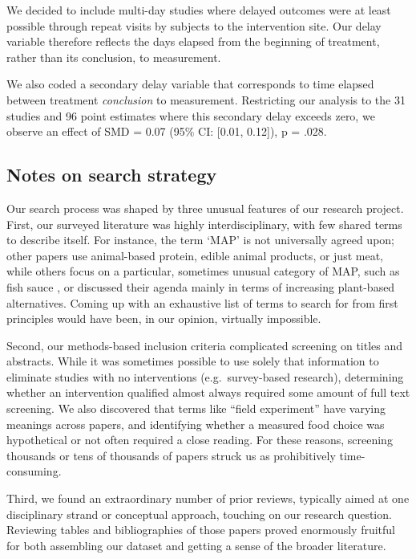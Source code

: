 \documentclass[sn-nature,referee,pdflatex]{sn-jnl}
\begin{document}
We decided to include multi-day studies where delayed outcomes were at
least possible through repeat visits by subjects to the intervention
site. Our delay variable therefore reflects the days elapsed from the
beginning of treatment, rather than its conclusion, to measurement.

We also coded a secondary delay variable that corresponds to time
elapsed between treatment \emph{conclusion} to measurement. Restricting
our analysis to the 31 studies and 96 point estimates where this
secondary delay exceeds zero, we observe an effect of SMD = 0.07 (95\%
CI: {[}0.01, 0.12{]}), p = .028.

\subsection{Notes on search strategy}\label{Sec5.2}

Our search process was shaped by three unusual features of our research
project. First, our surveyed literature was highly interdisciplinary,
with few shared terms to describe itself. For instance, the term `MAP'
is not universally agreed upon; other papers use animal-based protein,
edible animal products, or just meat, while others focus on a
particular, sometimes unusual category of MAP, such as fish sauce
\citep{kanchanachitra2020}, or discussed their agenda mainly in terms of
increasing plant-based alternatives. Coming up with an exhaustive list
of terms to search for from first principles would have been, in our
opinion, virtually impossible.

Second, our methods-based inclusion criteria complicated screening on
titles and abstracts. While it was sometimes possible to use solely that
information to eliminate studies with no interventions
(e.g.~survey-based research), determining whether an intervention
qualified almost always required some amount of full text screening. We
also discovered that terms like ``field experiment'' have varying
meanings across papers, and identifying whether a measured food choice
was hypothetical or not often required a close reading. For these
reasons, screening thousands or tens of thousands of papers struck us as
prohibitively time-consuming.

Third, we found an extraordinary number of prior reviews, typically
aimed at one disciplinary strand or conceptual approach, touching on our
research question. Reviewing tables and bibliographies of those papers
proved enormously fruitful for both assembling our dataset and getting a
sense of the broader literature.
\end{document}
